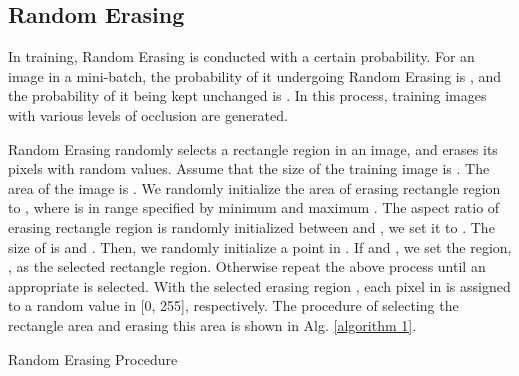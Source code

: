 \documentclass[10pt,twocolumn,letterpaper]{article}
\begin{document}
\subsection{Random Erasing}
In training, Random Erasing is conducted with a certain probability. For an image  in a mini-batch, the probability of it undergoing Random Erasing is , and the probability of it being kept unchanged is .
In this process, training images with various levels of occlusion are generated. 
    
    Random Erasing randomly selects a rectangle region  in an image, and erases its pixels with random values. Assume that the size of the training image is . The area of the image is . We randomly initialize the area of erasing rectangle region to , where  is in range specified by minimum  and maximum . The aspect ratio of erasing rectangle region is randomly initialized between  and , we set it to . The size of  is  and .
    Then, we randomly initialize a point  in . If  and , we set the region, , as the selected rectangle region. Otherwise repeat the above process until an appropriate  is selected. With the selected erasing region , each pixel in  is assigned to a random value in [0, 255], respectively. The procedure of selecting the rectangle area and erasing this area is shown in Alg. \ref{algorithm 1}.
    



\begin{algorithm}[t]
\SetAlgoLined
{}
\caption{Random Erasing Procedure}\label{algorithm 1}

\end{algorithm}
\end{document}
